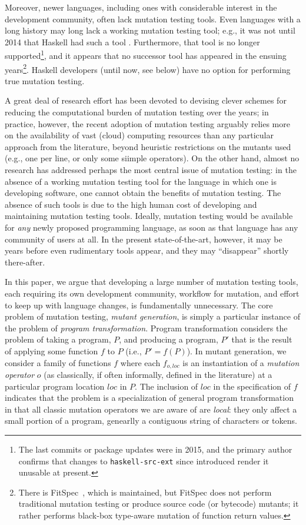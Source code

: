 \documentclass[sigconf,review, anonymous]{acmart}
\begin{document}
Moreover, newer languages, including ones with considerable interest
in the development community, often lack mutation testing tools.  Even
languages with a long history may long lack a working mutation testing
tool; e.g., it was not until 2014 that Haskell had such a tool
\cite{mucheck}.  Furthermore, that tool is no longer
supported\footnote{The last commits or package updates were in 2015, and the
primary author confirms that changes to {\tt haskell-src-ext} since
introduced render it unusable at present.}, and it
appears that no successor tool has appeared in the ensuing
years\footnote{There is FitSpec~\cite{FitSpec}, which is maintained,
  but FitSpec does not perform traditional mutation testing or produce
  source code (or bytecode) mutants; it rather
  performs black-box type-aware mutation of function return values.}.
Haskell developers (until now, see below) have no option for
performing true mutation testing.

A great deal of research effort has been devoted to devising clever
schemes for reducing the computational burden of mutation testing over
the years; in practice, however, the recent adoption of mutation
testing arguably relies more on the availability of vast (cloud) computing
resources than any particular approach from the literature, beyond
heuristic restrictions on the mutants used (e.g., one per line, or
only some siimple operators).   On the other hand, almost no
research has addressed perhaps the most central issue of
mutation testing: in the absence of a working mutation testing
tool for the language in which one is developing software, one cannot
obtain the benefits of mutation testing.  The absence of such tools is
due to the high human cost of developing and maintaining mutation
testing tools.  Ideally, mutation testing would be available for
\emph{any} newly proposed programming language, as soon as that
language has any community of users at all.  In the present
state-of-the-art, however, it may be years before even rudimentary
tools appear, and they may ``disappear'' shortly there-after.

In this paper, we argue that developing a large number of mutation
testing tools, each requiring its own development community, workflow
for mutation, and effort to keep up with language changes, is fundamentally
unnecessary.  The core problem of mutation testing,
\emph{mutant generation}, is simply a particular instance of the
problem of \emph{program transformation}.  Program transformation
considers the problem of taking a program, $P$, and producing a
program, $P'$ that is the result of applying some function $f$ to $P$
(i.e., $P' = f(P)$).  In mutant generation, we
consider a family of functions $f$ where each $f_{o,loc}$ is an
instantiation of a \emph{mutation operator} $o$  (as classically, if
often informally, defined in the literature) at a particular program
location $loc$ in $P$.  The inclusion of $loc$ in the specification of
$f$ indicates that the problem is a specialization of general
program transformation in that all classic mutation operators we are
aware of are \emph{local}: they only affect a small portion of a
program, genearlly a contiguous string of characters or tokens.
\end{document}
